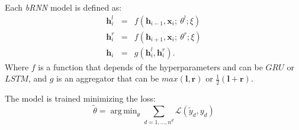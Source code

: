 \documentclass{article}
\DeclareMathOperator*{\argmin}{arg\,min}
\newcommand{\vect}[1]{\bm{#1}}
\def\loss{\mathcal{L}}
\begin{document}
Each \emph{bRNN} model is defined as:
\begin{eqnarray*}
  \vect{h}^l_i &=& f(\vect{h}_{i-1}, \vect{x}_i;\ \theta^l;\xi)\\
  \vect{h}^r_i &=& f(\vect{h}_{i+1}, \vect{x}_i;\ \theta^r;\xi)\\
  \vect{h}_i &=& g(\vect{h}^l_i, \vect{h}^r_i).
\end{eqnarray*}
Where $f$ is a function that depends of the hyperparameters and can be
$GRU$ or $LSTM$, and $g$ is an aggregator that can be $max(\vect{l},\vect{r})$ or $\frac{1}{2}(\vect{l}+\vect{r})$.

The model is trained minimizing the loss:
\begin{equation*}
  \tilde\theta = \argmin_{\theta}\sum_{d=1,\dots,n^{d}}\loss(\tilde y_d, y_d)
\end{equation*}
%
%
\end{document}
